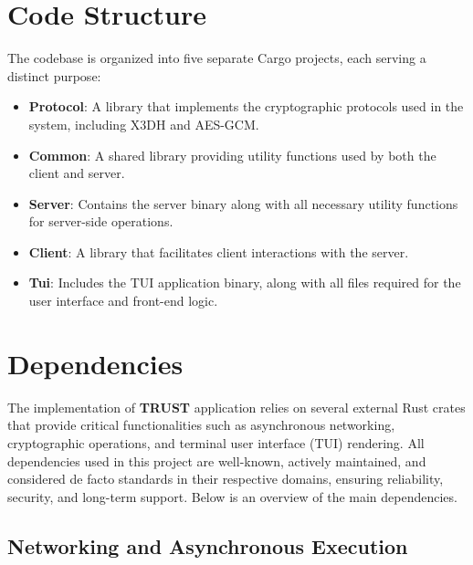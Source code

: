 \section{Code Structure}
\label{sec:CodeStructure}


The codebase is organized into five separate Cargo projects, each serving a distinct purpose:

\begin{itemize}
    \item \textbf{Protocol}: A library that implements the cryptographic protocols used in the system, including X3DH and AES-GCM.
    \item \textbf{Common}: A shared library providing utility functions used by both the client and server.
    \item \textbf{Server}: Contains the server binary along with all necessary utility functions for server-side operations.
    \item \textbf{Client}: A library that facilitates client interactions with the server.
    \item \textbf{Tui}: Includes the TUI application binary, along with all files required for the user interface and front-end logic.
\end{itemize}

\section{Dependencies}
\label{sec:Dependecies}


The implementation of \textbf{TRUST} application relies on several external Rust crates that provide critical functionalities such as asynchronous networking, cryptographic operations, and terminal user interface (TUI) rendering. All dependencies used in this project are well-known, actively maintained, and considered de facto standards in their respective domains, ensuring reliability, security, and long-term support. Below is an overview of the main dependencies.   

\subsection{Networking and Asynchronous Execution}
\label{subsec:NetworkingAndAsynchronousExecution}

